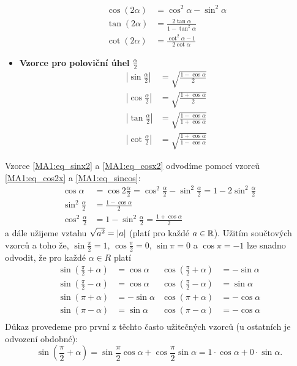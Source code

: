 \begin{itemize}
\begin{align}
          \cos(2\alpha)   &= \cos^2\alpha - \sin^2\alpha          \label{MA1:eq_cos2x} \\ 
          \tan(2\alpha)   &= \frac{2\tan\alpha}{1-\tan^2\alpha}   \label{MA1:eq_tan2x} \\ 
          \cot(2\alpha)   &= \frac{\cot^2\alpha - 1}{2\cot\alpha} \label{MA1:eq_cot2x}
        \end{align}
      \item \textbf{Vzorce pro poloviční úhel $\displaystyle\frac{\alpha}{2}$}
        \begin{align}
          \left\lvert\sin\frac{\alpha}{2}\right\rvert   
            &= \sqrt{\frac{1-\cos\alpha}{2}}                      \label{MA1:eq_sinx2} \\ 
          \left\lvert\cos\frac{\alpha}{2}\right\rvert   
            &= \sqrt{\frac{1+\cos\alpha}{2}}                      \label{MA1:eq_cosx2} \\ 
          \left\lvert\tan\frac{\alpha}{2}\right\rvert   
            &= \sqrt{\frac{1-\cos\alpha}{1+\cos\alpha}}           \label{MA1:eq_tanx2} \\ 
          \left\lvert\cot\frac{\alpha}{2}\right\rvert   
            &= \sqrt{\frac{1+\cos\alpha}{1-\cos\alpha}}           \label{MA1:eq_cotx2}
        \end{align}
    \end{itemize}
    Vzorce \ref{MA1:eq_sinx2} a \ref{MA1:eq_cosx2} odvodíme pomocí vzorců \ref{MA1:eq_cos2x} a \ref{MA1:eq_sincos}:
    \begin{align*}
      \cos\alpha &= 
      \cos2\frac{\alpha}{2}=\cos^2\frac{\alpha}{2}-\sin^2\frac{\alpha}{2}=1-2\sin^2\frac{\alpha}{2} \\
      \sin^2\frac{\alpha}{2} &= \frac{1-\cos\alpha}{2}   \\
      \cos^2\frac{\alpha}{2} &= 1 - \sin^2\frac{\alpha}{2} = \frac{1+\cos\alpha}{2} 
    \end{align*}
    a dále užijeme vztahu $\sqrt{a^2}=\left\lvert a\right\rvert$ (platí pro každé $a\in\mathbb{R}$). Užitím součtových vzorců a toho že, 
	$\sin\frac{\pi}{2} = 1$, $\cos\frac{\pi}{2} = 0$, $\sin\pi = 0$ a $\cos\pi = -1$ lze snadno odvodit, 
	že pro každé $\alpha\in R$ platí
    \begin{align*}
      \sin\left(\frac{\pi}{2}+\alpha\right) &=  \cos\alpha  &   \cos\left(\frac{\pi}{2}+\alpha\right) &= -\sin\alpha \\
      \sin\left(\frac{\pi}{2}-\alpha\right) &=  \cos\alpha  &   \cos\left(\frac{\pi}{2}-\alpha\right) &=  \sin\alpha \\
      \sin\left(\pi+\alpha\right)           &= -\sin\alpha  &   \cos\left(\pi+\alpha\right)           &= -\cos\alpha \\
      \sin\left(\pi-\alpha\right)           &=  \sin\alpha  &   \cos\left(\pi-\alpha\right)           &= -\cos\alpha \\
    \end{align*}
    \newline Důkaz provedeme pro první z těchto často užitečných vzorců (u ostatních je odvození obdobné):
    $$\sin\left(\frac{\pi}{2}+\alpha\right) = \sin\frac{\pi}{2}\cos\alpha + \cos\frac{\pi}{2}\sin\alpha = 1\cdot\cos\alpha + 0\cdot\sin\alpha.$$
